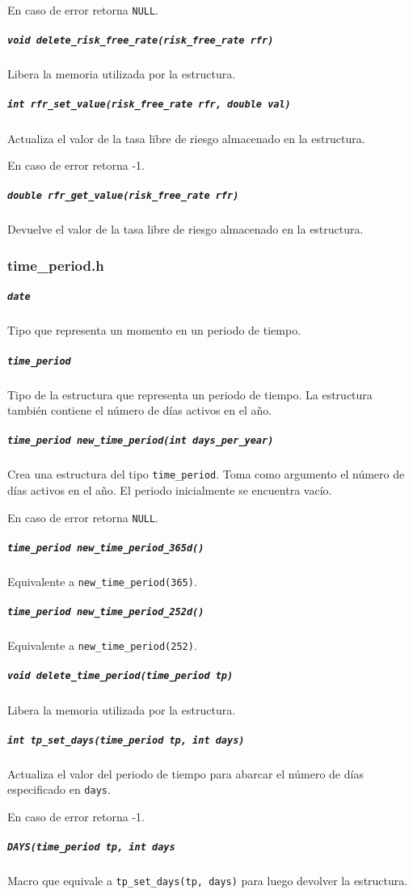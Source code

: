 \documentclass[12pt,a4paper,final]{article}
\begin{document}
				En caso de error retorna \texttt{NULL}.

			\subparagraph{\texttt{void delete\_risk\_free\_rate(risk\_free\_rate rfr)}}
				Libera la memoria utilizada por la estructura.

			\subparagraph{\texttt{int rfr\_set\_value(risk\_free\_rate rfr, double val)}}
				Actualiza el valor de la tasa libre de riesgo almacenado en la estructura.

				En caso de error retorna -1.

			\subparagraph{\texttt{double rfr\_get\_value(risk\_free\_rate rfr)}}
				Devuelve el valor de la tasa libre de riesgo almacenado en la estructura.

		\subsubsection{time\_period.h}

			\subparagraph{\texttt{date}}
				Tipo que representa un momento en un periodo de tiempo.

			\subparagraph{\texttt{time\_period}}
				Tipo de la estructura que representa un periodo de tiempo. La estructura
				también contiene el número de días activos en el año.

			\subparagraph{\texttt{time\_period new\_time\_period(int days\_per\_year)}}
				Crea una estructura del tipo \texttt{time\_period}. Toma como argumento
				el número de días activos en el año. El periodo inicialmente se encuentra vacío.

				En caso de error retorna \texttt{NULL}.

			\subparagraph{\texttt{time\_period new\_time\_period\_365d()}}
				Equivalente a \texttt{new\_time\_period(365)}.

			\subparagraph{\texttt{time\_period new\_time\_period\_252d()}}
				Equivalente a \texttt{new\_time\_period(252)}.

			\subparagraph{\texttt{void delete\_time\_period(time\_period tp)}}
				Libera la memoria utilizada por la estructura.

			\subparagraph{\texttt{int tp\_set\_days(time\_period tp, int days)}}
				Actualiza el valor del periodo de tiempo para abarcar el número de días
				especificado en \texttt{days}.

				En caso de error retorna -1.

			\subparagraph{\texttt{DAYS(time\_period tp, int days}}
				Macro que equivale a \texttt{tp\_set\_days(tp, days)} para luego devolver
				la estructura.
\end{document}
